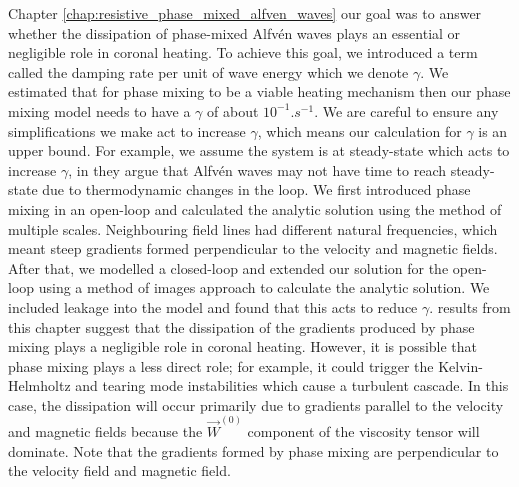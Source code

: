  Chapter\alexedit{,} \ref{chap:resistive_phase_mixed_alfven_waves} our goal was to answer whether the dissipation of phase-mixed Alfv\'en waves plays an essential or negligible role in coronal heating. To achieve this goal, we introduced a term called the damping rate per unit of wave energy which we denote $\gamma$. We estimated that for phase mixing to be a viable heating mechanism then our phase mixing model needs to have a $\gamma$ of about $10^{-1}\si{.s^{-1}}$. We are careful to ensure any simplifications we make act to increase $\gamma$, which means our calculation for $\gamma$ is an upper bound. For example, we assume the system is at steady-state which acts to increase $\gamma$, in \citet{Arregui2015} they argue that Alfv\'en waves may not have time to reach steady-state due to thermodynamic changes in the loop. We first introduced phase mixing in an open-loop and calculated the analytic solution using the method of multiple scales. Neighbouring field lines had different natural frequencies, which meant steep gradients formed perpendicular to the velocity and magnetic fields. After that, we modelled a closed-loop and extended our solution for the open-loop using a method of images approach to calculate the analytic solution. We included leakage into the model and found that this acts to reduce $\gamma$.  results from this chapter suggest that the dissipation of the gradients produced by phase mixing plays a negligible role in coronal heating. However, it is possible that phase mixing plays a less direct role; for example, it could trigger the Kelvin-Helmholtz and tearing mode instabilities which cause a turbulent cascade. In this case, the dissipation will occur primarily due to gradients parallel to the velocity and magnetic fields because the $\vec{W}^{(0)}$ component of the viscosity tensor will dominate. Note that the gradients formed by phase mixing are perpendicular to the velocity field and magnetic field.


